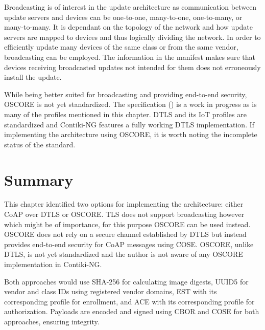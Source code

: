 \documentclass[0-thesis.tex]{subfiles}
\begin{document}
Broadcasting is of interest in the update architecture as communication between update
servers and devices can be one-to-one, many-to-one, one-to-many, or many-to-many. It is
dependant on the topology of the network and how update servers are mapped to devices and
thus logically dividing the network. In order to efficiently update many devices of the
same class or from the same vendor, broadcasting can be employed. The information in the
manifest makes sure that devices receiving broadcasted updates not intended for them does
not erroneously install the update.

While being better suited for broadcasting and providing end-to-end security, OSCORE is
not yet standardized. The specification (\parencite{oscore}) is a work in progress as is
many of the profiles mentioned in this chapter. DTLS and its IoT profiles are standardized
and Contiki-NG features a fully working DTLS implementation. If implementing the
architecture using OSCORE, it is worth noting the incomplete status of the standard.

\section{Summary}
\label{sec:profile-summary}
This chapter identified two options for implementing the architecture: either CoAP over
DTLS or OSCORE. TLS does not support broadcasting however which might be of importance,
for this purpose OSCORE can be used instead. OSCORE does not rely on a secure channel
established by DTLS but instead provides end-to-end security for CoAP messages using COSE.
OSCORE, unlike DTLS, is not yet standardized and the author is not aware of any OSCORE
implementation in Contiki-NG. 

Both approaches would use SHA-256 for calculating image digests, UUID5 for vendor and
class IDs using registered vendor domains, EST with its corresponding profile for
enrollment, and ACE with its corresponding profile for authorization. Payloads are encoded
and signed using CBOR and COSE for both approaches, ensuring integrity.
\end{document}
